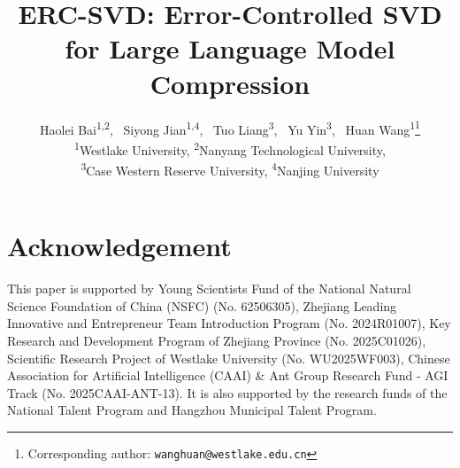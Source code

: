 \documentclass{article}
\title{ERC-SVD: Error-Controlled SVD for Large Language Model Compression}
\author{%
    Haolei Bai\textsuperscript{1,2},
    ~Siyong Jian\textsuperscript{1,4},
    ~Tuo Liang\textsuperscript{3},
    ~Yu Yin\textsuperscript{3},
    ~Huan Wang\textsuperscript{1}\thanks{Corresponding author: \texttt{wanghuan@westlake.edu.cn}}\\
  \textsuperscript{1}Westlake University, \textsuperscript{2}Nanyang Technological University, \\ \textsuperscript{3}Case Western Reserve University, \textsuperscript{4}Nanjing University\\
}
\begin{document}
\maketitle









\section*{Acknowledgement}
This paper is supported by Young Scientists Fund of the National Natural Science Foundation of China (NSFC) (No. 62506305), Zhejiang Leading Innovative and Entrepreneur Team Introduction Program (No. 2024R01007), Key Research and Development Program of Zhejiang Province (No. 2025C01026), Scientific Research Project of Westlake University (No. WU2025WF003), Chinese Association for Artificial Intelligence (CAAI) \& Ant Group Research Fund - AGI Track (No. 2025CAAI-ANT-13). It is also supported by the research funds of the National Talent Program and Hangzhou Municipal Talent Program.


{}




\clearpage
{}

\end{document}

